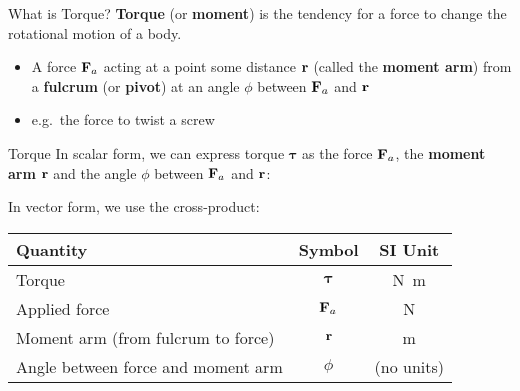 \documentclass[12pt,compress,aspectratio=169]{beamer}
\newcommand{\mb}[1]{\ensuremath\mathbf{#1}}
\newcommand{\eq}[2]{\vspace{#1}{\Large\begin{displaymath}#2\end{displaymath}}}
\begin{document}
\begin{frame}{What is Torque?}
  \textbf{Torque} (or \textbf{moment}) is the tendency for a force to change
  the rotational motion of a body.
  
  \begin{itemize}
  \item A force $\mb{F}_a$ acting at a point some distance $\mb{r}$ (called the
    \textbf{moment arm}) from a \textbf{fulcrum} (or \textbf{pivot}) at an angle
    $\phi$ between $\mb{F}_a$ and $\mb{r}$
  \item e.g.\ the force to twist a screw
  \end{itemize}
  \begin{center}
  \end{center}
\end{frame}



\begin{frame}{Torque}
  In scalar form, we can express torque $\bm{\tau}$ as the force $\mb{F}_a$,
  the \textbf{moment arm} $\mb{r}$ and the angle $\phi$ between $\mb{F}_a$ and
  $\mb{r}$:

  \eq{-.2in}{
    \boxed{\tau=rF_a\sin\phi}
  }
  
  In vector form, we use the cross-product:

  \eq{-.2in}{
    \boxed{\bm{\tau}=\mb{r}\times\mb{F}_a}
  }
  \begin{center}
    \begin{tabular}{l|c|c}
      \rowcolor{pink}
      \textbf{Quantity} & \textbf{Symbol} & \textbf{SI Unit} \\ \hline
      Torque        & $\bm{\tau}$ & \si{\newton\metre} \\
      Applied force & $\mb{F}_a$  & \si{\newton} \\
      Moment arm (from fulcrum to force) & $\mb{r}$ & \si{\metre}\\
      Angle between force and moment arm & $\phi$ & (no units)
    \end{tabular}
  \end{center}
\end{frame}
\end{document}
